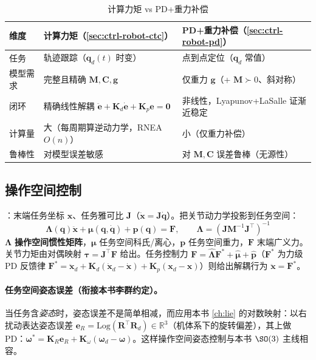 \begin{table}[H]\centering\small
\caption{计算力矩 vs PD+重力补偿}
\label{tab:ctrl-ctc-vs-pd}
\begin{tabular}{p{} p{} p{}}
\toprule
维度 & 计算力矩（\cref{sec:ctrl-robot-ctc}） & PD+重力补偿（\cref{sec:ctrl-robot-pd}） \\
\midrule
任务 & 轨迹跟踪（$\mathbf{q}_d(t)$ 时变） & 点到点定位（$\mathbf{q}_d$ 常值） \\
模型需求 & 完整且精确 $\mathbf{M},\mathbf{C},\mathbf{g}$ & 仅重力 $\mathbf{g}$（+ $\mathbf{M}\succ0$、斜对称） \\
闭环 & 精确线性解耦 $\ddot{\mathbf{e}}+\mathbf{K}_d\dot{\mathbf{e}}+\mathbf{K}_p\mathbf{e}=\mathbf{0}$ & 非线性，Lyapunov+LaSalle 证渐近稳定 \\
计算量 & 大（每周期算逆动力学，RNEA $O(n)$） & 小（仅重力补偿） \\
鲁棒性 & 对模型误差敏感 & 对 $\mathbf{M},\mathbf{C}$ 误差鲁棒（无源性） \\
\bottomrule
\end{tabular}
\end{table}

\subsection{操作空间控制}
\label{sec:ctrl-robot-osc}

：末端任务坐标 $\mathbf{x}$、任务雅可比 $\mathbf{J}$（$\dot{\mathbf{x}}=\mathbf{J}\dot{\mathbf{q}}$）。把关节动力学投影到任务空间：
\begin{equation}
  \boldsymbol{\Lambda}(\mathbf{q})\ddot{\mathbf{x}}+\boldsymbol{\mu}(\mathbf{q},\dot{\mathbf{q}})+\mathbf{p}(\mathbf{q})=\mathbf{F},\qquad
  \boxed{\boldsymbol{\Lambda}=(\mathbf{J}\mathbf{M}^{-1}\mathbf{J}^\top)^{-1}}
  \label{eq:ctrl-osc}
\end{equation}
$\boldsymbol{\Lambda}$ \textbf{操作空间惯性矩阵}，$\boldsymbol{\mu}$ 任务空间科氏/离心，$\mathbf{p}$ 任务空间重力，$\mathbf{F}$ 末端广义力。关节力矩由对偶映射 $\boldsymbol{\tau}=\mathbf{J}^\top\mathbf{F}$ 给出。任务控制力 $\mathbf{F}=\hat{\boldsymbol{\Lambda}}\mathbf{F}^*+\hat{\boldsymbol{\mu}}+\hat{\mathbf{p}}$（$\mathbf{F}^*$ 为力级 PD 反馈律 $\mathbf{F}^*=\ddot{\mathbf{x}}_d+\mathbf{K}_d(\dot{\mathbf{x}}_d-\dot{\mathbf{x}})+\mathbf{K}_p(\mathbf{x}_d-\mathbf{x})$）则给出解耦行为 $\ddot{\mathbf{x}}=\mathbf{F}^*$。

\paragraph{任务空间姿态误差（衔接本书李群约定）。}
当任务含\emph{姿态}时，姿态误差不是简单相减，而应用本书 \cref{ch:lie} 的对数映射：以右扰动表达姿态误差 $\mathbf{e}_R=\mathrm{Log}(\mathbf{R}^\top\mathbf{R}_d)\in\mathbb{R}^3$（机体系下的旋转偏差），其上做 PD：$\boldsymbol{\omega}^*=\mathbf{K}_R\mathbf{e}_R+\mathbf{K}_\omega(\boldsymbol{\omega}_d-\boldsymbol{\omega})$。这样操作空间姿态控制与本书 $\SO(3)$ 主线相容。

